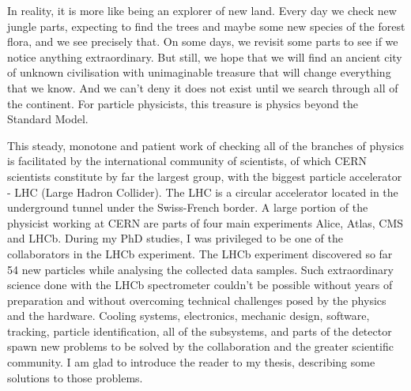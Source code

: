 In reality, it is more like being an explorer of new land.
Every day we check new jungle parts, expecting to find the trees and maybe some new species of the forest flora, and we see precisely that.
On some days, we revisit some parts to see if we notice anything extraordinary.
But still, we hope that we will find an ancient city of unknown civilisation with unimaginable treasure that will change everything that we know.
And we can't deny it does not exist until we search through all of the continent.
For particle physicists, this treasure is physics beyond the Standard Model.

This steady, monotone and patient work of checking all of the branches of physics is facilitated by the international community of scientists, of which CERN scientists constitute by far the largest group, with the biggest particle accelerator - LHC (Large Hadron Collider).
The LHC is a circular accelerator located in the underground tunnel under the Swiss-French border.
A large portion of the physicist working at CERN are parts of four main experiments Alice, Atlas, CMS and LHCb.
During my PhD studies, I was privileged to be one of the collaborators in the LHCb experiment.
The LHCb experiment discovered so far 54 new particles while analysing the collected data samples.
Such extraordinary science done with the LHCb spectrometer couldn't be possible without years of preparation and without overcoming technical challenges posed by the physics and the hardware.
Cooling systems, electronics, mechanic design, software, tracking, particle identification, all of the subsystems, and parts of the detector spawn new problems to be solved by the collaboration and the greater scientific community.
I am glad to introduce the reader to my thesis, describing some solutions to those problems.
